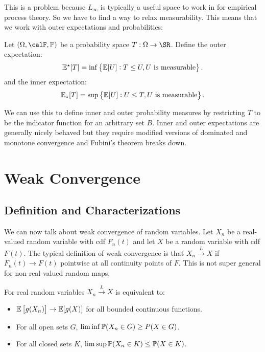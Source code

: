 This is a problem because \(L_\infty\) is typically a useful space to work in for empirical process theory. So we have to find a way to relax measurability. This means that we work with outer expectations and probabilities:
\begin{definition}
	Let \((\Omega,\calF,\P)\) be a probability space \(T:\Omega \to \SR\). Define the outer expectation:
	 \[
		 \E^\star[T] = \inf\left\{\E[U]: T\leq U, U\text{ is measurable}\right\}
	.\]
	and the inner expectation:
	\[
		\E_\star[T] = \sup\left\{\E[U]: U\leq T, U\text{ is measurable}\right\}
	.\] 
\end{definition}
We can use this to define inner and outer probability measures by restricting \(T\) to be the indicator function for an arbitrary set  \(B\). Inner and outer expectations are generally nicely behaved but they require modified versions of dominated and monotone convergence and Fubini's theorem breaks down.

\newpage
\section{Weak Convergence}%
\label{sec:weak-convergence}

\subsection{Definition and Characterizations}%
\label{subsec:wcov-def}

We can now talk about weak convergence of random variables. Let \(X_n\) be a real-valued random variable with cdf  \(F_n(t)\) and let  \(X\) be a random variable with cdf  \(F(t)\). The typical definition of weak convergence is that \(X_n \overset{L}{\to} X\) if  \(F_n(t) \to F(t)\) pointwise at all continuity points of  \(F\). This is not super general for non-real valued random maps.

\begin{theorem}[Portmanteau]
	\label{thm:portmanteau}
	For real random variables \(X_n\overset{L}{\to}X\) is equivalent to:
	 \begin{itemize}
		 \item \(\E\left[g(X_n)\right] \to \E[g(X)]\) for all bounded continuous functions. 
		 \item For all open sets \(G\),  \(\lim\inf \P(X_n\in G) \geq P(X\in G)\).
		 \item For all closed sets \(K\),  \(\lim\sup \P(X_n \in K) \leq \P(X \in K)\).
	\end{itemize}
\end{theorem}

